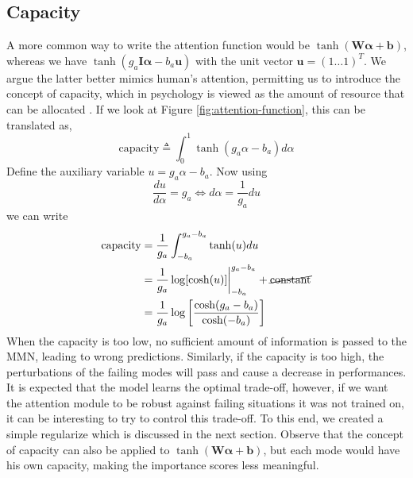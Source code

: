 \subsection*{Capacity}
A more common way to write the attention function would be $\tanh(\mathbf{W}\bm{\alpha}+\mathbf{b})$, whereas we have $\tanh(g_a\mathbf{I}\bm{\alpha}-b_a\mathbf{u})$ with the unit vector $\mathbf{u} = (1 \ldots 1)^T$. We argue the latter better mimics human's attention, permitting us to introduce the concept of capacity, which in psychology is viewed as the amount of resource that can be allocated \citep{attention-is-effort}. If we look at Figure \ref{fig:attention-function}, this can be translated as,
\begin{equation}
\text{capacity} \triangleq \int_0^1 \tanh(g_a\alpha - b_a)d\alpha 
\end{equation}
Define the auxiliary variable $u = g_a\alpha - b_a$. Now using
\begin{equation}
\frac{du}{d\alpha} = g_a \Leftrightarrow d\alpha = \frac{1}{g_a}du
\end{equation}
we can write 
\begin{equation}
\begin{split}
\text{capacity} &= \frac{1}{g_a} \int_{-b_a}^{g_a-b_a} \tanh(u)du  \\
&= \frac{1}{g_a}\log[\cosh(u)]\bigg\rvert_{-b_a}^{g_a-b_a} + \cancel{\text{constant}} \\
&= \frac{1}{g_a}\log\bigg[\frac{\cosh(g_a - b_a)}{\cosh(-b_a)}\bigg]
\end{split}
\end{equation}
When the capacity is too low, no sufficient amount of information is passed to the MMN, leading to wrong predictions. Similarly, if the capacity is too high, the perturbations of the failing modes will pass and cause a decrease in performances. It is expected that the model learns the optimal trade-off, however, if we want the attention module to be robust against failing situations it was not trained on, it can be interesting to try to control this trade-off. To this end, we created a simple regularize which is discussed in the next section. Observe that the concept of capacity can also be applied to $\tanh(\mathbf{W}\bm{\alpha}+\mathbf{b})$, but each mode would have his own capacity, making the importance scores less meaningful.



